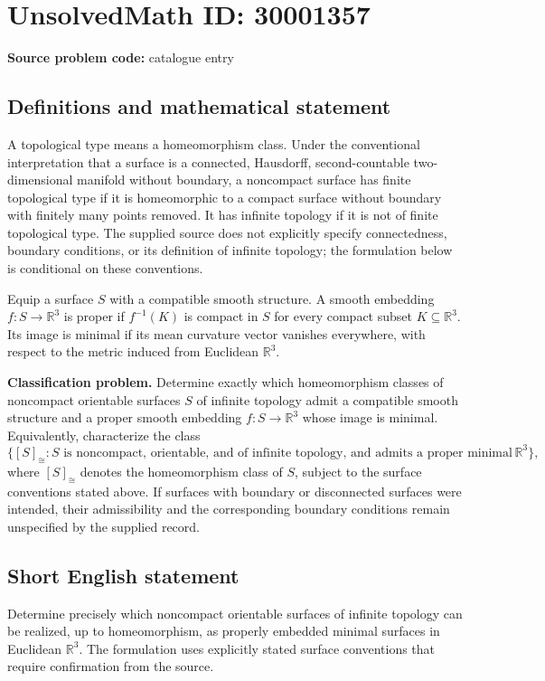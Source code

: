 \documentclass[11pt]{article}
\newcommand{\R}{\mathbb{R}}
\begin{document}
\section*{UnsolvedMath ID: 30001357}
\textbf{Source problem code:} catalogue entry
\subsection{Definitions and mathematical statement}
A topological type means a homeomorphism class. Under the conventional interpretation that a surface is a connected, Hausdorff, second-countable two-dimensional manifold without boundary, a noncompact surface has finite topological type if it is homeomorphic to a compact surface without boundary with finitely many points removed. It has infinite topology if it is not of finite topological type. The supplied source does not explicitly specify connectedness, boundary conditions, or its definition of infinite topology; the formulation below is conditional on these conventions.

Equip a surface \(S\) with a compatible smooth structure. A smooth embedding \(f:S\to\R^3\) is proper if \(f^{-1}(K)\) is compact in \(S\) for every compact subset \(K\subseteq\R^3\). Its image is minimal if its mean curvature vector vanishes everywhere, with respect to the metric induced from Euclidean \(\R^3\).

\textbf{Classification problem.} Determine exactly which homeomorphism classes of noncompact orientable surfaces \(S\) of infinite topology admit a compatible smooth structure and a proper smooth embedding \(f:S\to\R^3\) whose image is minimal. Equivalently, characterize the class
\[
\bigl\{[S]_{\cong}: S\text{ is noncompact, orientable, and of infinite topology, and admits a proper minimal embedding into }\R^3\bigr\},
\]
where \([S]_{\cong}\) denotes the homeomorphism class of \(S\), subject to the surface conventions stated above. If surfaces with boundary or disconnected surfaces were intended, their admissibility and the corresponding boundary conditions remain unspecified by the supplied record.
\subsection{Short English statement}
Determine precisely which noncompact orientable surfaces of infinite topology can be realized, up to homeomorphism, as properly embedded minimal surfaces in Euclidean \(\R^3\). The formulation uses explicitly stated surface conventions that require confirmation from the source.
\end{document}
